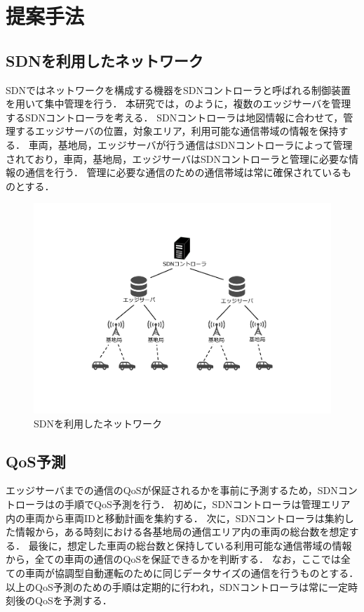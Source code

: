 \documentclass[a4paper,10pt,twocolumn,uplatex]{jsarticle}
\begin{document}
\section{提案手法}
\subsection{SDNを利用したネットワーク}
SDNではネットワークを構成する機器をSDNコントローラと呼ばれる制御装置を用いて集中管理を行う．
本研究では，のように，複数のエッジサーバを管理するSDNコントローラを考える．
SDNコントローラは地図情報に合わせて，管理するエッジサーバの位置，対象エリア，利用可能な通信帯域の情報を保持する．
車両，基地局，エッジサーバが行う通信はSDNコントローラによって管理されており，車両，基地局，エッジサーバはSDNコントローラと管理に必要な情報の通信を行う．
管理に必要な通信のための通信帯域は常に確保されているものとする．

\begin{figure}[t]
	\begin{centering}
    \includegraphics[width=0.94\linewidth]{img/202306_SDNnetwork.pdf}
    \caption{SDNを利用したネットワーク}
    \label{fig:SDNnetwork}
    \end{centering}
\end{figure}

\subsection{QoS予測}
\label{QoSprediction}
エッジサーバまでの通信のQoSが保証されるかを事前に予測するため，SDNコントローラはの手順でQoS予測を行う．
初めに，SDNコントローラは管理エリア内の車両から車両IDと移動計画を集約する．
次に，SDNコントローラは集約した情報から，ある時刻における各基地局の通信エリア内の車両の総台数を想定する．
最後に，想定した車両の総台数と保持している利用可能な通信帯域の情報から，全ての車両の通信のQoSを保証できるかを判断する．
なお，ここでは全ての車両が協調型自動運転のために同じデータサイズの通信を行うものとする．
以上のQoS予測のための手順は定期的に行われ，SDNコントローラは常に一定時刻後のQoSを予測する．
\end{document}

